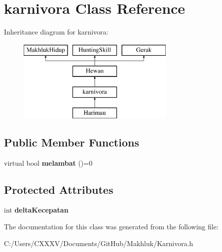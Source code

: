 \hypertarget{classkarnivora}{}\section{karnivora Class Reference}
\label{classkarnivora}
Inheritance diagram for karnivora\+:\begin{figure}[H]
\begin{center}
\leavevmode
\includegraphics[height=4.000000cm]{classkarnivora}
\end{center}
\end{figure}
\subsection*{Public Member Functions}
\begin{DoxyCompactItemize}
\item 
virtual bool {\bfseries melambat} ()=0\hypertarget{classkarnivora_a94ff5f34e424327e3b6114fa69d519d1}{}\label{classkarnivora_a94ff5f34e424327e3b6114fa69d519d1}

\end{DoxyCompactItemize}
\subsection*{Protected Attributes}
\begin{DoxyCompactItemize}
\item 
int {\bfseries delta\+Kecepatan}\hypertarget{classkarnivora_af4eecf0a583853a91f8b26f153b4f97a}{}\label{classkarnivora_af4eecf0a583853a91f8b26f153b4f97a}

\end{DoxyCompactItemize}


The documentation for this class was generated from the following file\+:\begin{DoxyCompactItemize}
\item 
C\+:/\+Users/\+C\+X\+X\+X\+V/\+Documents/\+Git\+Hub/\+Makhluk/Karnivora.\+h\end{DoxyCompactItemize}
